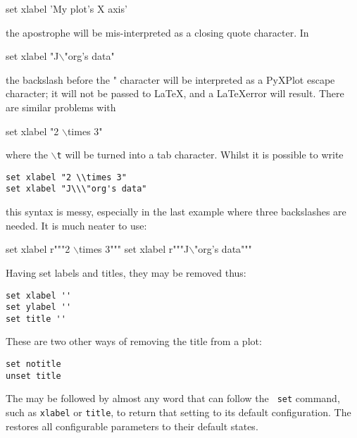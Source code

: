 \begin{dontdo}
set xlabel 'My plot's X axis'
\end{dontdo}

\noindent the apostrophe will be mis-interpreted as a closing quote character. In

\begin{dontdo}
set xlabel "J$\backslash$"org's data"
\end{dontdo}

\noindent the backslash before the " character will be interpreted as a PyXPlot escape character; it will not be passed to \LaTeX, and a \LaTeX error will result. There are similar problems with

\begin{dontdo}
set xlabel "2 $\backslash$times 3"
\end{dontdo}

\noindent where the \texttt{$\backslash$t} will be turned into a tab character. Whilst it is possible to write

\begin{verbatim}
set xlabel "2 \\times 3"
set xlabel "J\\\"org's data"
\end{verbatim}

\noindent this syntax is messy, especially in the last example where three backslashes are needed. It is much neater to use:

\begin{dodo}
set xlabel r"""2 $\backslash$times 3"""
set xlabel r"""J$\backslash$"org's data"""
\end{dodo}

Having set labels and titles, they may be removed thus:

\begin{verbatim}
set xlabel ''
set ylabel ''
set title ''
\end{verbatim}

\noindent These are two other ways of removing the title from a plot:

\begin{verbatim}
set notitle
unset title
\end{verbatim}

The  may be followed by almost any word that can follow the {\tt
set} command, such as {\tt xlabel} or {\tt title}, to return that setting to
its default configuration. The  restores all configurable
parameters to their default states.

